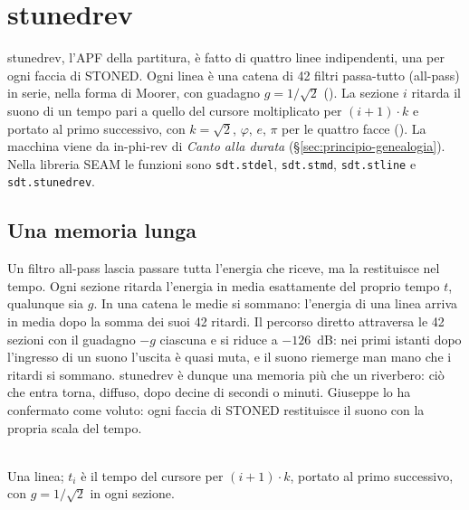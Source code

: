 \chapter{stunedrev}\label{cap:stunedrev}
stunedrev, l'APF della partitura, è fatto di quattro linee indipendenti, una per ogni faccia di STONED.
Ogni linea è una catena di 42 filtri passa-tutto (all-pass) in serie, nella forma di Moorer, con guadagno $g = 1/\sqrt{2}$ ().
La sezione $i$ ritarda il suono di un tempo pari a quello del cursore moltiplicato per $(i+1) \cdot k$ e portato al primo successivo, con $k = \sqrt{2}$, $\varphi$, $e$, $\pi$ per le quattro facce ().
La macchina viene da in-phi-rev di \emph{Canto alla durata} (\S\ref{sec:principio-genealogia}).
Nella libreria SEAM le funzioni sono \texttt{sdt.stdel}, \texttt{sdt.stmd}, \texttt{sdt.stline} e \texttt{sdt.stunedrev}.

\section{Una memoria lunga}
Un filtro all-pass lascia passare tutta l'energia che riceve, ma la restituisce nel tempo.
Ogni sezione ritarda l'energia in media esattamente del proprio tempo $t$, qualunque sia $g$.
In una catena le medie si sommano: l'energia di una linea arriva in media dopo la somma dei suoi 42 ritardi.
Il percorso diretto attraversa le 42 sezioni con il guadagno $-g$ ciascuna e si riduce a $-126$~dB: nei primi istanti dopo l'ingresso di un suono l'uscita è quasi muta, e il suono riemerge man mano che i ritardi si sommano.
stunedrev è dunque una memoria più che un riverbero: ciò che entra torna, diffuso, dopo decine di secondi o minuti.
Giuseppe lo ha confermato come voluto: ogni faccia di STONED restituisce il suono con la propria scala del tempo.

\begin{center}
\\[1mm]
{\small Una linea; $t_i$ è il tempo del cursore per $(i+1)\cdot k$, portato al primo successivo, con $g = 1/\sqrt{2}$ in ogni sezione.}
\end{center}


